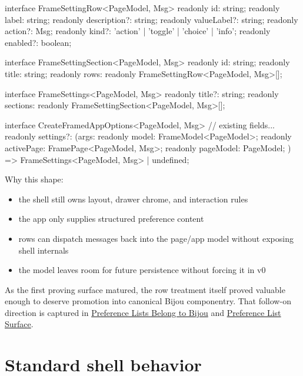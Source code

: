 \begin{CodeBlock}
interface FrameSettingRow<PageModel, Msg> {
  readonly id: string;
  readonly label: string;
  readonly description?: string;
  readonly valueLabel?: string;
  readonly action?: Msg;
  readonly kind?: 'action' | 'toggle' | 'choice' | 'info';
  readonly enabled?: boolean;
}

interface FrameSettingSection<PageModel, Msg> {
  readonly id: string;
  readonly title: string;
  readonly rows: readonly FrameSettingRow<PageModel, Msg>[];
}

interface FrameSettings<PageModel, Msg> {
  readonly title?: string;
  readonly sections: readonly FrameSettingSection<PageModel, Msg>[];
}

interface CreateFramedAppOptions<PageModel, Msg> {
  // existing fields...
  readonly settings?: (args: {
    readonly model: FrameModel<PageModel>;
    readonly activePage: FramePage<PageModel, Msg>;
    readonly pageModel: PageModel;
  }) => FrameSettings<PageModel, Msg> | undefined;
}
\end{CodeBlock}

Why this shape:

\begin{itemize}
\tightlist
\item
  the shell still owns layout, drawer chrome, and interaction rules
\item
  the app only supplies structured preference content
\item
  rows can dispatch messages back into the page/app model without exposing shell internals
\item
  the model leaves room for future persistence without forcing it in v0
\end{itemize}

As the first proving surface matured, the row treatment itself proved valuable enough to deserve promotion into canonical Bijou componentry. That follow-on direction is captured in \href{https://github.com/flyingrobots/bijou/blob/cbd70612140e7a450d764b3c7be1c6af878b99bc/docs/strategy/preference-lists-belong-to-bijou.md}{Preference Lists Belong to Bijou} and \href{https://github.com/flyingrobots/bijou/blob/cbd70612140e7a450d764b3c7be1c6af878b99bc/docs/specs/preference-list-surface.spec.json}{Preference List Surface}.

\section{Standard shell behavior}\label{record-057-standard-shell-behavior}

